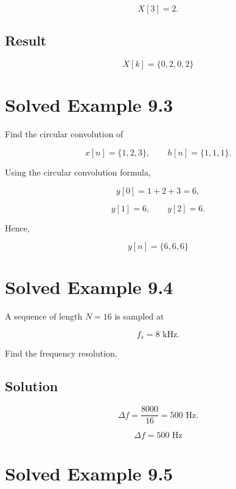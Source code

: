 \[
X[3]=2.
\]


\subsection{Result}

\[
\boxed{
X[k]=\{0,2,0,2\}
}
\]


\section{Solved Example 9.3}

Find the circular convolution of

\[
x[n]=\{1,2,3\},
\qquad
h[n]=\{1,1,1\}.
\]

Using the circular convolution formula,

\[
y[0]=1+2+3=6,
\]

\[
y[1]=6,
\qquad
y[2]=6.
\]

Hence,

\[
\boxed{
y[n]=\{6,6,6\}
}
\]


\section{Solved Example 9.4}

A sequence of length \(N=16\) is sampled at

\[
f_s=8\text{ kHz}.
\]

Find the frequency resolution.


\subsection{Solution}

\[
\Delta f=
\frac{8000}{16}=500\text{ Hz}.
\]

\[
\boxed{
\Delta f=500\text{ Hz}
}
\]


\section{Solved Example 9.5}

